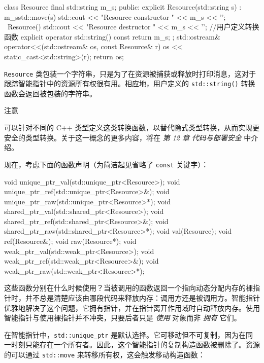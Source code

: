 \begin{codebox}[cpp]
class Resource final {
    std::string m_s;
public:
    explicit Resource(std::string s) : m_s{std::move(s)} {
        std::cout << "Resource constructor " << m_s << '\n';
    }
    ~Resource() {
        std::cout << "Resource destructor " << m_s << '\n';
    }
    //用户定义转换函数
    explicit operator std::string() const { return m_s; }
};
std::ostream& operator<<(std::ostream& os, const Resource& r) {
    os << static_cast<std::string>(r);
    return os;
}
\end{codebox}

\texttt{Resource} 类包装一个字符串，只是为了在资源被捕获或释放时打印消息，这对于跟踪智能指针中的资源所有权很有用。相应地，用户定义的 \texttt{std::\allowbreak{}string(\allowbreak{})\allowbreak{}} 转换函数会返回被包装的字符串。

\begin{myNotic}{注意}

可以针对不同的 C++ 类型定义这类转换函数，以替代隐式类型转换，从而实现更安全的类型转换。关于这一概念的更多内容，将在 \emph{第 12 章} \emph{代码与部署安全} 中介绍。
\end{myNotic}

现在，考虑下面的函数声明（为简洁起见省略了 \texttt{const} 关键字）：

\begin{codebox}[cpp]
void unique_ptr_val(std::unique_ptr<Resource>);
void unique_ptr_ref(std::unique_ptr<Resource>&);
void unique_ptr_raw(std::unique_ptr<Resource>*);
void shared_ptr_val(std::shared_ptr<Resource>);
void shared_ptr_ref(std::shared_ptr<Resource>&);
void shared_ptr_raw(std::shared_ptr<Resource>*);
void val(Resource);
void ref(Resource&);
void raw(Resource*);
void weak_ptr_val(std::weak_ptr<Resource>);
void weak_ptr_ref(std::weak_ptr<Resource>&);
void weak_ptr_raw(std::weak_ptr<Resource>*);
\end{codebox}

\label{idx:456}
这些函数分别在什么时候使用？当被调用的函数返回一个指向动态分配内存的裸指针时，并不总是清楚应该由哪段代码来释放内存：调用方还是被调用方。智能指针优雅地解决了这个问题，它拥有指针，并在指针离开作用域时自动释放内存。使用智能指针与使用裸指针并不冲突，只要后者只是 \emph{使用} 对象而非 \emph{拥有} 它们。

在智能指针中，\texttt{std::\allowbreak{}unique\_\allowbreak{}ptr} 是默认选择。它可移动但不可复制，因为在同一时刻只能存在一个所有者。因此，这个智能指针的复制构造函数被删除了。资源的可以通过 \texttt{std::move} 来转移所有权，这会触发移动构造函数：

